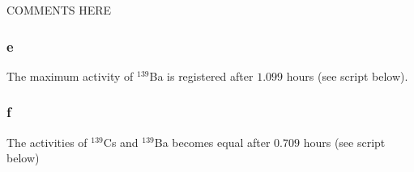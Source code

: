 COMMENTS HERE

\subsubsection*{e}
The maximum activity of $^{139}$Ba is registered after $1.099$ hours (see script below).

\subsubsection*{f}
The activities of $^{139}$Cs and $^{139}$Ba becomes equal after $0.709$ hours (see script below)



